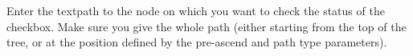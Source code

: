 
Enter the textpath to the node on which you want to check the status of  the checkbox. Make sure you give the whole path (either starting from the top of the tree, or at the position defined by the pre-ascend and path type parameters).




